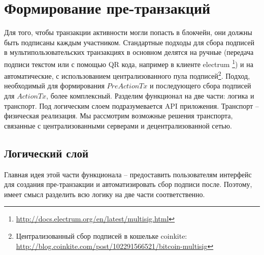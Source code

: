 \documentclass[specification,annotation]{itmo-student-thesis}
\begin{document}
\section{Формирование пре-транзакций}

Для того, чтобы транзакции активности могли попасть в блокчейн, они
должны быть подписаны каждым участником. Стандартные подходы для сбора
подписей в мультипользовательских транзакциях в основном делятся на
ручные (передача подписи текстом или с помощью QR кода, например в
клиенте
electrum \footnote{\url{http://docs.electrum.org/en/latest/multisig.html}})
и на автоматические, с использованием централизованного пула
подписей\footnote{Централизованный сбор подписей в кошельке coinkite:
  \url{http://blog.coinkite.com/post/102291566521/bitcoin-multisig}}. Подход,
необходимый для формирования $PreActionTx$ и последующего сбора
подписей для $ActionTx$, более комплексный. Разделим функционал на две
части: логика и транспорт. Под логическим слоем подразумевается API
приложения. Транспорт -- физическая реализация. Мы рассмотрим
возможные решения транспорта, связанные с централизованными серверами
и децентрализованной сетью.

\subsection{Логический слой}

Главная идея этой части функционала -- предоставить пользователям
интерфейс для создания пре-транзакции и автоматизировать сбор подписи
после. Поэтому, имеет смысл разделить всю логику на две части соответственно.
\end{document}
